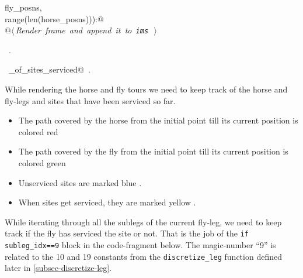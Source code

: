 \documentclass[11.5pt]{report}
\begin{document}
\begin{flushleft}
\begin{minipage}{\linewidth}
\begin{list}{}{}
\mbox{}\verb@                                                 fly_posns,   \@\\
\mbox{}\verb@                                                 range(len(horse_posns))):@\\
\mbox{}\verb@          @\hbox{$\langle\,${\itshape Render frame and append it to \verb|ims|}\nobreak\ {\footnotesize {}}$\,\rangle$}\verb@@\\
\mbox{}\verb@@{\NWsep}
\end{list}
\vspace{-1.5ex}
\footnotesize
\begin{list}{}{\setlength{\itemsep}{-\parsep}\setlength{\itemindent}{-\leftmargin}}
\item \NWtxtMacroRefIn\ .
\item \NWtxtIdentsDefed\nobreak\  \verb@number_of_sites_serviced@\nobreak\ .
\item{}
\end{list}
\end{minipage}\vspace{4ex}
\end{flushleft}



\vspace{-0.8cm} \newchunk While rendering the horse and fly tours we need to keep track of the horse and 
fly-legs and sites that have been serviced so far.  

\begin{itemize}
\item The path covered by the horse from the initial point till its current position is colored red   
\item The path covered by the fly from the initial point till its current position is colored green  
\item Unserviced sites are marked blue . 
\item When sites get serviced, they are marked yellow .
\end{itemize}

While iterating through all the sublegs of the current fly-leg, we need to keep track if the fly has serviced the site or not. That is the 
job of the \verb|if subleg_idx==9| block in the code-fragment below. The magic-number  ``9'' is related to the 10 and 19 constants from the 
\verb|discretize_leg| function defined later in \autoref{subsec-discretize-leg}. 
\end{document}
